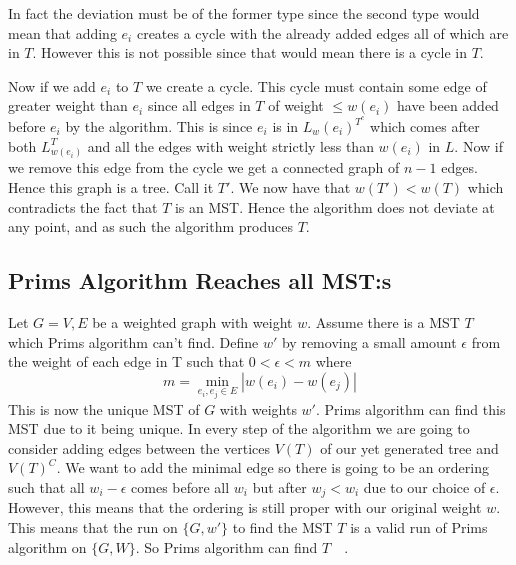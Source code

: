 \documentclass[nobib]{tufte-handout}
\begin{document}
In fact the deviation must be of the former type since the second type would mean that adding $e_i$ creates a cycle with the already added edges all of which are in $T$. However this is not possible since that would mean there is a cycle in $T$.

Now if we add $e_i$ to $T$ we create a cycle. This cycle must contain some edge of greater weight than $e_i$ since all edges in $T$ of weight $\leq w(e_i)$ have been added before $e_i$ by the algorithm. This is since $e_i$ is in $L_w(e_i)^{T^c}$ which comes after both $L_{w(e_i)}^T$ and all the edges with weight strictly less than $w(e_i)$ in $L$. Now if we remove this edge from the cycle we get a connected graph of $n - 1$ edges. Hence this graph is a tree. Call it $T'$. We now have that $w(T') < w(T)$ which contradicts the fact that $T$ is an MST. Hence the algorithm does not deviate at any point, and as such the algorithm produces $T$.

            
        
\subsection{Prims Algorithm Reaches all MST:s}

Let \(G={V,E} \) be a weighted graph with weight \( w \). Assume there is a MST \( T \) which Prims algorithm can't find. Define \( w' \) by removing a small amount \( \epsilon \) from the weight of each edge in T such that \( 0<\epsilon<m\) where 
\begin{equation*}
 m=\min\limits_{e_i,e_j\in E}|w(e_i)-w(e_j)|
\end{equation*}This is now the unique MST of \(G \) with weights \( w' \). Prims algorithm can find this MST due to it being unique. In every step of the algorithm we are going to consider adding edges between the vertices \( V(T)\) of our yet generated tree and \(V(T)^C\). We want to add the minimal edge so there is going to be an ordering such that all \( w_i-\epsilon \) comes before all \( w_i\) but after \( w_j<w_i \) due to our choice of \( \epsilon \). However, this means that the ordering is still proper with our original weight \( w \). This means that the run on \( \{G,w'\} \) to find the MST \(T\) is a valid run of Prims algorithm on \( \{G,W\}\). So Prims algorithm can find \( T \quad \).
\end{document}
